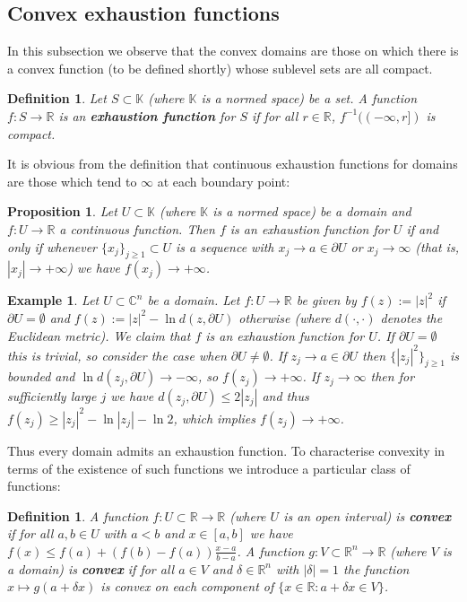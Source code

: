 \documentclass[11pt,a4paper, final, twoside]{article}
\newtheorem{definition}[theorem]{Definition}
\newtheorem{example}[theorem]{Example}
\newtheorem{proposition}[theorem]{Proposition}
\numberwithin{equation}{section}
\newcommand{\C}{\mathbb C}
\newcommand{\R}{\mathbb R}
\newcommand{\RC}{\mathbb K}
\newcommand{\bd}{\partial}
\newcommand{\emetric}{d}
\begin{document}
\subsection{Convex exhaustion functions}
In this subsection we observe that the convex domains are those on which there is a convex function (to be defined shortly) whose sublevel sets are all compact.
\begin{definition}
Let $S\subset\RC$ (where $\RC$ is a normed space) be a set. A function $f\colon S\to \R$ is an \textbf{exhaustion function} for $S$ if for all $r\in\R$, $f^{-1}((-\infty,r])$ is compact.
\end{definition}
It is obvious from the definition that continuous exhaustion functions for domains are those which tend to $\infty$ at each boundary point:
\begin{proposition}
\label{exasdf}
Let $U\subset\RC$ (where $\RC$ is a normed space) be a domain and $f\colon U\to\R$ a continuous function. Then $f$ is an exhaustion function for $U$ if and only if whenever $\{x_j\}_{j\geq 1}\subset U$
is a sequence with $x_j\to a\in\bd U$ or $x_j\to\infty$ (that is, $|x_j|\to +\infty$) we have $f(x_j)\to+\infty$.
\end{proposition}
\begin{example}
\label{exex}
Let $U\subset\C^n$ be a domain. Let $f\colon U\to\R$ be given by $f(z):=|z|^2$ if $\bd U=\emptyset$ and $f(z):=|z|^2-\ln \emetric(z,\bd U)$ otherwise (where $\emetric(\cdot,\cdot)$ denotes the Euclidean metric).
We claim that $f$ is an exhaustion function for $U$. If $\bd U=\emptyset$ this is trivial, so consider the case when $\bd U\neq\emptyset$.
If $z_j\to a\in\bd U$ then $\{|z_j|^2\}_{j\geq 1}$ is bounded and $\ln\emetric(z_j,\bd U)\to-\infty$, so $f(z_j)\to+\infty$.
If $z_j\to\infty$ then for sufficiently large $j$ we have $\emetric(z_j,\bd U)\leq 2|z_j|$ and thus $f(z_j)\geq |z_j|^2-\ln |z_j|-\ln 2$, which implies $f(z_j)\to+\infty$. 
\end{example}
Thus every domain admits an exhaustion function. To characterise convexity in terms of the existence of such functions we introduce a particular class of functions:
\begin{definition}
A function $f\colon U\subset\R\to\R$ (where $U$ is an open interval) is \textbf{convex} if for all $a,b\in U$ with $a<b$ and $x\in [a,b]$ we have $f(x)\leq f(a)+(f(b)-f(a))\frac{x-a}{b-a}$. A function
$g\colon V\subset\R^n\to\R$ (where $V$ is a domain) is \textbf{convex} if for all $a\in V$ and $\delta\in\R^n$ with $|\delta|=1$ the function $x\mapsto g(a+\delta x)$ is convex on each component
of $\{x\in\R\colon a+\delta x\in V\}$. 
\end{definition}
\end{document}
